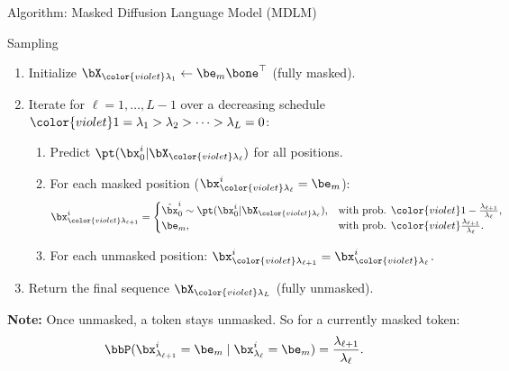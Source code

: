 \documentclass{beamer}
\begin{document}
\begin{frame}{Algorithm: Masked Diffusion Language Model (MDLM)}
	\begin{block}{Sampling}
		\begin{enumerate}
			\item Initialize $\bX_{{\color{violet}\lambda_1}} \leftarrow \be_m \bone^\top$ (fully masked).
			\item Iterate for $\ell = 1, \ldots, L-1$ over a decreasing schedule ${\color{violet}1 = \lambda_1 > \lambda_2 > \cdots > \lambda_L = 0}$:
			\begin{enumerate}
				\item Predict $\pt(\bx_0^i | \bX_{{\color{violet}\lambda_\ell}})$ for all positions.
				\item For each masked position ($\bx_{{\color{violet}\lambda_\ell}}^i = \be_m$):
				\vspace{-0.3cm}
				\[
					\bx_{{\color{violet}\lambda_{\ell+1}}}^i =
					\begin{cases}
						\hat\bx_0^i \sim \pt(\bx_0^i | \bX_{{\color{violet}\lambda_\ell}}), & \text{with prob. } {\color{violet}1 - \tfrac{\lambda_{\ell+1}}{\lambda_\ell}},\\
						\be_m, & \text{with prob. } {\color{violet}\tfrac{\lambda_{\ell+1}}{\lambda_\ell}}.
					\end{cases}
				\]
				\vspace{-0.5cm}
				\item For each unmasked position: $\bx_{{\color{violet}\lambda_{\ell+1}}}^i = \bx_{{\color{violet}\lambda_\ell}}^i$.
			\end{enumerate}
			\item Return the final sequence $\bX_{{\color{violet}\lambda_L}}$ (fully unmasked).
		\end{enumerate}
	\end{block}
	\textbf{Note:} Once unmasked, a token stays unmasked. So for a currently masked token:
	\[
		\bbP(\bx_{\lambda_{\ell+1}} ^i = \be_m \mid \bx_{\lambda_\ell}^i = \be_m)
		= \frac{\lambda_{\ell+1}}{\lambda_\ell}.
	\]
\end{frame}
\end{document}

